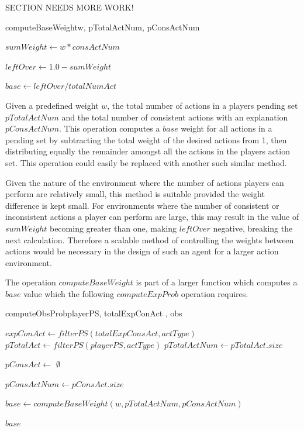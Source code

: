 \documentclass[parskip]{cs4rep}
\begin{document}
SECTION NEEDS MORE WORK!

\begin{pseudocode}[ruled]{computeBaseWeight}{w, pTotalActNum, pConsActNum}
\begin{algorithm}[H]

$sumWeight \gets w * consActNum$

$leftOver \gets 1.0 - sumWeight$

$base \gets leftOver / totalNumAct$

\end{algorithm}
\end{pseudocode}

Given a predefined weight $w$, the total number of actions in a players pending set $pTotalActNum$ and the total number of consistent actions with an explanation $pConsActNum$. This operation computes a $base$ weight for all actions in a pending set by subtracting the total weight of the desired actions from 1, then distributing equally the remainder amongst all the actions in the players action set. This operation could easily be replaced with another such similar method.

Given the nature of the environment where the number of actions players can perform are relatively small, this method is suitable provided the weight difference is kept small. For environments where the number of consistent or inconsistent actions a player can perform are large, this may result in the value of $sumWeight$ becoming greater than one, making $leftOver$ negative, breaking the next calculation. Therefore a scalable method of controlling the weights between actions would be necessary in the design of such an agent for a larger action environment.

The operation $computeBaseWeight$ is part of a larger function which computes a $base$ value which the following $computeExpProb$ operation requires.

\begin{pseudocode}[ruled]{computeObsProb}{playerPS, totalExpConAct , obs}
\begin{algorithm}[H]
$expConAct \gets filterPS(totalExpConsAct, actType)$ \newline
$pTotalAct \gets filterPS(playerPS, actType)$\newline
$pTotalActNum \gets pTotalAct.size$ \newline

$pConsAct \gets $ $\emptyset$ \newline


$pConsActNum \gets pConsAct.size$\newline

$base \gets computeBaseWeight(w, pTotalActNum, pConsActNum)$\newline 

\Return $base$

\end{algorithm}
\end{pseudocode}
\end{document}

